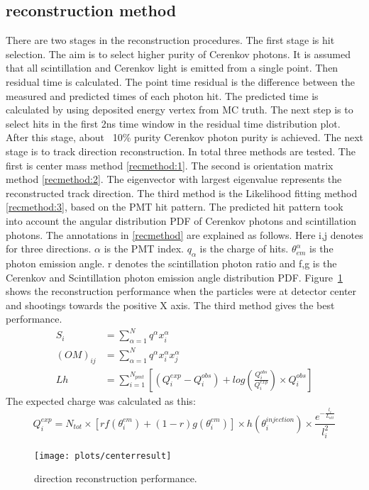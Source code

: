 \documentclass[a4paper,10pt]{cpc-hepnp}
\begin{document}
\subsection{reconstruction method}
There are two stages in the reconstruction procedures. The first stage is hit
selection. The aim is to select higher purity of Cerenkov photons. It is
assumed that all scintillation and Cerenkov light is emitted from a single
point. Then residual time is calculated. The point time residual is the
difference between the measured and predicted times of each photon hit.
The predicted time is calculated by using deposited energy vertex from MC truth. The next step
is to select hits in the first 2ns time window in the residual time
distribution plot. After this stage, about ~10\% purity Cerenkov photon purity
is achieved. The next stage is to track direction reconstruction. In total
three methods are tested. The first is center mass method
\eqref{recmethod:1}. The second is orientation matrix method
\eqref{recmethod:2}. The eigenvector with largest eigenvalue represents the
reconstructed track direction. The third method is the Likelihood fitting
method \eqref{recmethod:3}, based on the PMT hit pattern. The predicted hit
pattern took into account the angular distribution PDF of Cerenkov
photons and scintillation photons. The annotations in \eqref{recmethod} are
explained as follows.
Here i,j denotes for three directions. $\alpha$ is the PMT index. $q_{\alpha}$ is the
charge of hits. $\theta_{em}^{\alpha}$  is the photon emission angle. r denotes
the scintillation photon ratio and f,g is the Cerenkov and Scintillation photon
emission angle distribution PDF. Figure~\ref{rec_performance} shows the
reconstruction performance when the particles were at detector center and
shootings towards the positive X axis. The third method gives the best
performance.
\begin{subequations}\label{recmethod}
\begin{align}
\label{recmethod:1}
S_{i} & = \sum_{\alpha=1}^{N}q^{\alpha}x_{i}^{\alpha}
\\
\label{recmethod:2}
(OM)_{ij} & = \sum_{\alpha=1}^{N}q^{\alpha}x_{i}^{\alpha}x_{j}^{\alpha}
\\
\label{recmethod:3}
Lh &= \sum_{i=1}^{N_{pmt}}[(Q^{exp}_{i}-Q^{obs}_{i})+log(\frac{Q^{obs}_{i}}{Q^{exp}_{i}}){\times}Q^{obs}_{i}]
\end{align}
\end{subequations}
The expected charge was calculated as this:
\begin{equation*}
Q^{exp}_{i} = N_{tot}\times[rf(\theta^{em}_{i})+(1-r)g(\theta^{em}_{i})]{\times}h(\theta^{injection}_{i})\times\frac{e^{-\frac{l_i}{L_{att}}}}{l_i^2}
\end{equation*}
\begin{figure}[htbp]
\centering %
\texttt{[image: plots/centerresult]}
\caption{\label{rec_performance} direction reconstruction performance.}
\end{figure}
\end{document}
